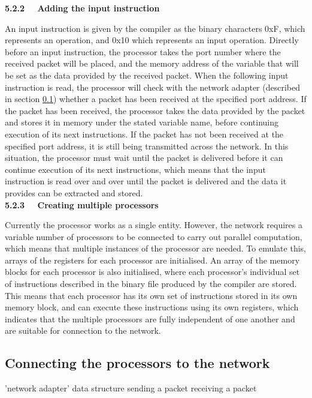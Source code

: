 \documentclass[a4paper, 12pt]{article}
\begin{document}
\noindent\textbf{5.2.2 \ \ Adding the input instruction}

\noindent An input instruction is given by the compiler as the binary characters 0xF, which represents an operation, and 0x10 which represents an input operation. Directly before an input instruction, the processor takes the port number where the received packet will be placed, and the memory address of the variable that will be set as the data provided by the received packet.  When the following input instruction is read, the processor will check with the network adapter (described in section \ref{sec:imp_network_adapter}) whether a packet has been received at the specified port address. If the packet has been received, the processor takes the data provided by the packet and stores it in memory under the stated variable name, before continuing execution of its next instructions. If the packet has not been received at the specified port address, it is still being transmitted across the network. In this situation, the processor must wait until the packet is delivered before it can continue execution of its next instructions, which means that the input instruction is read over and over until the packet is delivered and the data it provides can be extracted and stored.\\

\noindent\textbf{5.2.3 \ \ Creating multiple processors}

\noindent Currently the processor works as a single entity. However, the network requires a variable number of processors to be connected to carry out parallel computation, which means that multiple instances of the processor are needed. To emulate this, arrays of the registers for each processor are initialised. An array of the memory blocks for each processor is also initialised, where each processor's individual set of instructions described in the binary file produced by the compiler are stored. This means that each processor has its own set of instructions stored in its own memory block, and can execute these instructions using its own registers, which indicates that the multiple processors are fully independent of one another and are suitable for connection to the network.

\subsection{Connecting the processors to the network}
\label{sec:imp_network_adapter}

'network adapter' data structure
sending a packet
receiving a packet
\end{document}
